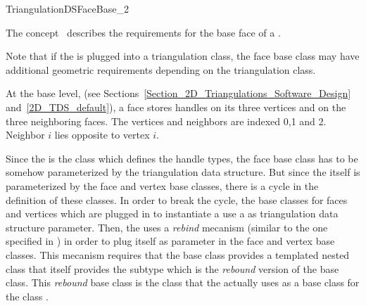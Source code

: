 

\begin{ccRefConcept}{TriangulationDSFaceBase_2}


\ccDefinition
The concept \ccRefName\ describes the requirements for
the base face of a .

Note that if  the  
is plugged  into a triangulation class, 
the face base class may have  additional geometric
requirements depending on the triangulation class.

At the base level, 
(see Sections~\ref{Section_2D_Triangulations_Software_Design} 
and~\ref{2D_TDS_default}),
a  face stores handles
 on  its three vertices  and on  the three neighboring faces.
The vertices and neighbors are indexed 0,1 and 2.
Neighbor $i$ lies opposite to vertex $i$.

Since the  is the class 
which defines the handle
types, the face base class has to be somehow 
parameterized by the triangulation
data structure.  But since the 
itself is parameterized by the face and vertex
base classes, there is a cycle in the definition of these classes.  
In order
to break the cycle, the base classes for faces and vertices
 which are plugged in to instantiate a
use a  as triangulation
data structure parameter. Then, 
the 
 uses a {\it rebind}  mecanism (similar to the one specified in
) in order to plug itself 
as parameter in the face and vertex  base classes. 
This mecanism requires that the base class  provides
a templated nested class  that
itself provides 
 the subtype 
which is the {\it rebound} version of the base class.
 This {\it rebound} base class is  the class
that the   
 actually  uses  as a base class for the class
.



\end{ccRefConcept}
